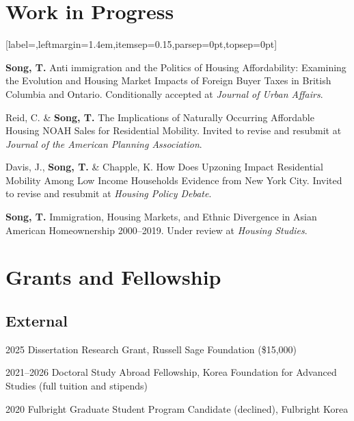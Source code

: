 \documentclass[11pt,letterpaper]{article}
\newcommand{\listitemspace}{0.25em}
\renewenvironment{itemize}
{\begin{list}{}{\setlength{\leftmargin}{1em}
\setlength{\parskip}{0pt}
\setlength{\itemsep}{\listitemspace}
\setlength{\parsep}{\listitemspace}}}
{\end{list}}
\newcommand{\money}[1]{(\$#1)}
\newcommand{\term}[1]{(#1)}
\newenvironment{subpoints}{%
  \begin{itemize}[label={},leftmargin=1.4em,itemsep=0.15\baselineskip,parsep=0pt,topsep=0pt]}%
  {\end{itemize}}
\begin{document}
\section{Work in Progress}
\begin{subpoints}
  \item \textbf{Song, T.} Anti immigration and the Politics of Housing Affordability: Examining the Evolution and Housing Market Impacts of Foreign Buyer Taxes in British Columbia and Ontario. Conditionally accepted at \emph{Journal of Urban Affairs}.
  \item Reid, C. \& \textbf{Song, T.} The Implications of Naturally Occurring Affordable Housing NOAH Sales for Residential Mobility. Invited to revise and resubmit at \emph{Journal of the American Planning Association}.
  \item Davis, J., \textbf{Song, T.} \& Chapple, K. How Does Upzoning Impact Residential Mobility Among Low Income Households Evidence from New York City. Invited to revise and resubmit at \emph{Housing Policy Debate}.
  \item \textbf{Song, T.} Immigration, Housing Markets, and Ethnic Divergence in Asian American Homeownership 2000–2019. Under review at \emph{Housing Studies}.
\end{subpoints}

\section{Grants and Fellowship}

\subsection{External}
\begin{tablist}
  \item[2025] \tab{}Dissertation Research Grant, Russell Sage Foundation \money{15,000}
  \item[2021–2026] \tab{}Doctoral Study Abroad Fellowship, Korea Foundation for Advanced Studies \term{full tuition and stipends}
  \item[2020] \tab{}Fulbright Graduate Student Program Candidate \term{declined}, Fulbright Korea
\end{tablist}
\end{document}
